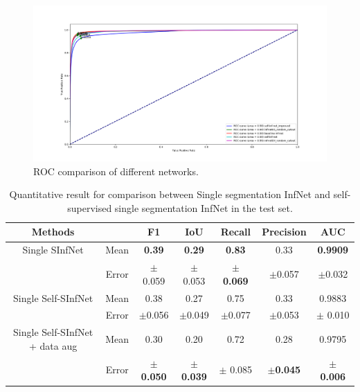  \begin{figure}
 	\centering
 	\small
 	\includegraphics[width=\linewidth]{single_rocs.png}
 	\caption{ROC comparison of different networks.}
 	\label{fig:single_rocs}
 \end{figure}
 
 \begin{table}[!ht]
 	\centering
 	\begin{tabular}{| c | c || c c c c c ||}
 		\hline
 		Methods & & F1 & IoU & Recall & Precision & AUC \\ \hline
 		Single SInfNet &  Mean & \textbf{0.39} & \textbf{0.29} & \textbf{0.83} & 0.33 & \textbf{0.9909} \\ \cline{2-7}
 		& Error & $\pm$ 0.059 & $\pm$ 0.053 & $\pm$ \textbf{0.069} & $\pm$0.057  & $\pm$0.032 \\ \hline
 		Single Self-SInfNet &  Mean & 0.38 & 0.27 & 0.75 & 0.33 & 0.9883  \\ \cline{2-7}
 		& Error & $\pm$0.056 & $\pm$0.049 &$\pm$0.077  & $\pm$0.053 & $\pm$  0.010 \\ \hline
 		Single Self-SInfNet + data aug &  Mean & 0.30 & 0.20 & 0.72 & 0.28 &  0.9795 \\ \cline{2-7}
 		& Error & $\pm$ \textbf{0.050}  & $\pm$  \textbf{0.039} & $\pm$ 0.085 & $\pm$\textbf{0.045} & $\pm$ \textbf{0.006}  \\ \hline
 	\end{tabular}
 	\caption{Quantitative result for comparison between Single segmentation InfNet and self-supervised single segmentation InfNet in the test set.}
 	\label{tab:single}
 \end{table}
 
